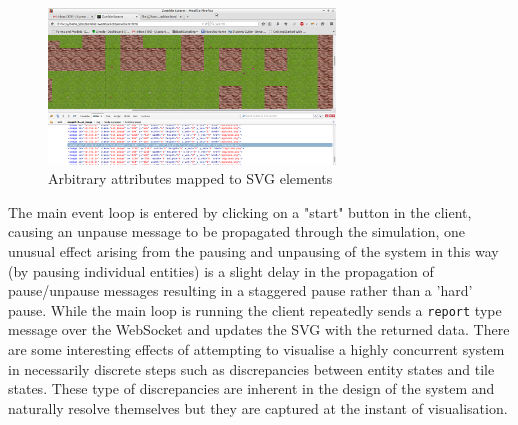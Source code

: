 \documentclass[10pt, a4paper, conference, compsocconf]{IEEEtran}
\begin{document}
\begin{figure}[h]
  \centering
  \includegraphics[width=3in]{../img/element_attributes.png}
  \caption{Arbitrary attributes mapped to SVG elements}
    \label{fig:svg_elements}
\end{figure}

The main event loop is entered by clicking on a "start" button in the client, causing an unpause message to be propagated through the simulation, one unusual effect arising from the pausing and unpausing of the system in this way (by pausing individual entities) is a slight delay in the propagation of pause/unpause messages resulting in a staggered pause rather than a 'hard' pause. While the main loop is running the client repeatedly sends a \verb+report+ type message over the WebSocket and updates the SVG with the returned data. There are some interesting effects of attempting to visualise a highly concurrent system in necessarily discrete steps such as discrepancies between entity states and tile states. These type of discrepancies are inherent in the design of the system and naturally resolve themselves but they are captured at the instant of visualisation.
\end{document}
